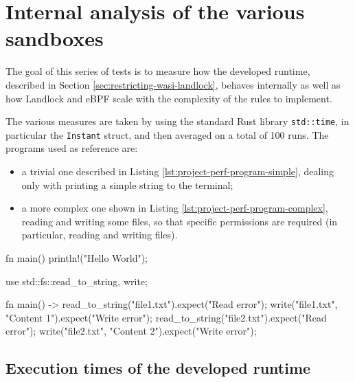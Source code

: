 \clearpage

\section{Internal analysis of the various sandboxes}
\label{sec:performance-internal-analysis}

The goal of this series of tests is to measure how the developed runtime,
described in Section \ref{sec:restricting-wasi-landlock}, behaves internally
as well as how Landlock and eBPF scale with the complexity of the rules
to implement.

The various measures are taken by using the standard Rust library \texttt{std::time},
in particular the \texttt{Instant} struct, and then averaged on a total of 100 runs.
The programs used as reference are:
\begin{itemize}
  \item a trivial one described in Listing \ref{lst:project-perf-program-simple},
        dealing only with printing a simple string to the terminal;
  \item a more complex one shown in Listing \ref{lst:project-perf-program-complex},
        reading and writing some files, so that specific permissions are required
        (in particular, reading and writing files).
\end{itemize}

\vspace*{0.5cm}

\begin{code}[language=Rust, caption=The trivial program., label=lst:project-perf-program-simple]
fn main() {
  println!("Hello World");
}
\end{code}

\begin{code}[language=Rust, caption=The more complex program., label=lst:project-perf-program-complex]
use std::fs::{read_to_string, write};

fn main() -> {
  read_to_string("file1.txt").expect("Read error");
  write("file1.txt", "Content 1").expect("Write error");
  read_to_string("file2.txt").expect("Read error");
  write("file2.txt", "Content 2").expect("Write error");
}  
\end{code}

\clearpage
\subsection{Execution times of the developed runtime}
\label{sec:performance-internal-analysis-execution-times}

